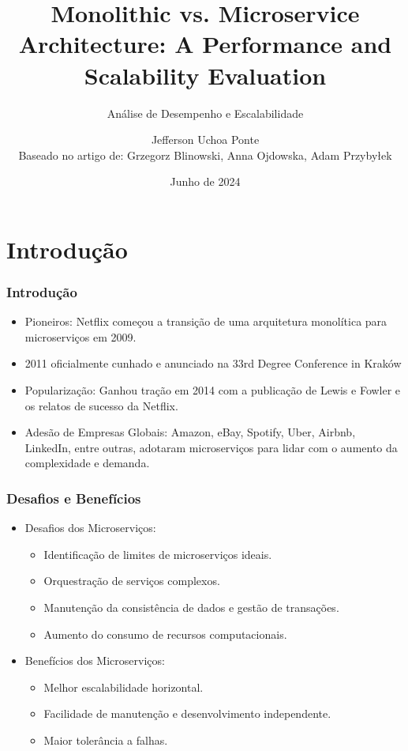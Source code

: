 \documentclass{beamer}
\title[Monolithic vs. Microservices] %
{Monolithic vs. Microservice Architecture: A Performance and Scalability Evaluation}
\subtitle{Análise de Desempenho e Escalabilidade}
\author[Jefferson Uchoa Ponte] %
{Jefferson Uchoa Ponte\\
Baseado no artigo de: Grzegorz Blinowski, Anna Ojdowska, Adam Przybyłek}
\institute[UECE] %
{
  Universidade Estadual do Ceará (UECE) \\
  Engenharia de Software \\
  Prof. Matheus Paixão
}
\date[Junho 2024] %
{Junho de 2024}
\begin{document}
\frame{\titlepage}

\section{Introdução}

\begin{frame}
\frametitle{Introdução}
\begin{itemize}
    \item Pioneiros: Netflix começou a transição de uma arquitetura monolítica para microserviços em 2009.
    \item 2011 oficialmente cunhado e anunciado na 33rd Degree Conference in Kraków
    \item Popularização: Ganhou tração em 2014 com a publicação de Lewis e Fowler e os relatos de sucesso da Netflix.
    \item Adesão de Empresas Globais: Amazon, eBay, Spotify, Uber, Airbnb, LinkedIn, entre outras, adotaram microserviços para lidar com o aumento da complexidade e demanda.
\end{itemize}
\end{frame}

\begin{frame}
\frametitle{Desafios e Benefícios}
\begin{itemize}
    \item Desafios dos Microserviços:
    \begin{itemize}
        \item Identificação de limites de microserviços ideais.
        \item Orquestração de serviços complexos.
        \item Manutenção da consistência de dados e gestão de transações.
        \item Aumento do consumo de recursos computacionais.
    \end{itemize}
    \item Benefícios dos Microserviços:
    \begin{itemize}
        \item Melhor escalabilidade horizontal.
        \item Facilidade de manutenção e desenvolvimento independente.
        \item Maior tolerância a falhas.
    \end{itemize}
\end{itemize}
\end{frame}
\end{document}
